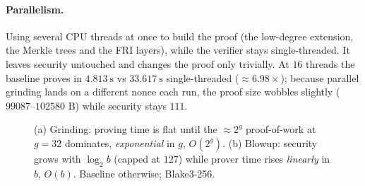 \documentclass[11pt]{article}
\begin{document}
\paragraph{Parallelism.} Using several CPU threads at once to build the proof (the low-degree
extension, the Merkle trees and the FRI layers), while the verifier stays single-threaded. It leaves
security untouched and changes the proof only trivially. At $16$ threads the baseline proves in
$\SI{4.813}{\second}$ vs $\SI{33.617}{\second}$ single-threaded ($\approx 6.98\times$); because parallel
grinding lands on a different nonce each run, the proof size wobbles slightly ($\num{99087}$--$\num{102580}$ B)
while security stays $111$.

\begin{figure}[htbp]\centering
{}
\caption{(a) Grinding: proving time is flat until the $\approx 2^{g}$ proof-of-work at $g=32$ dominates,
\emph{exponential} in $g$, $O(2^{g})$. (b) Blowup: security grows with $\log_2 b$ (capped at $127$)
while prover time rises \emph{linearly} in $b$, $O(b)$. Baseline otherwise; Blake3-256.}
\label{fig:params}
\end{figure}
\end{document}
